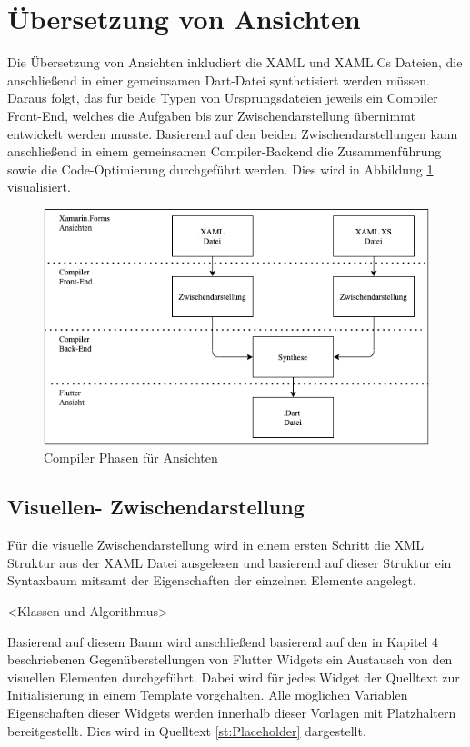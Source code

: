 \section{Übersetzung von Ansichten}
Die Übersetzung von Ansichten inkludiert die XAML und XAML.Cs Dateien, die anschließend in einer gemeinsamen Dart-Datei synthetisiert werden müssen.  Daraus folgt,  das für beide Typen von Ursprungsdateien jeweils ein Compiler Front-End,  welches die Aufgaben bis zur Zwischendarstellung übernimmt entwickelt werden musste.  Basierend auf den beiden Zwischendarstellungen kann anschließend in einem gemeinsamen Compiler-Backend die Zusammenführung sowie die Code-Optimierung durchgeführt werden.  Dies wird in Abbildung  \ref{fig:ViewCompilerPhases} visualisiert. 

\begin{figure}[!ht]
 \includegraphics[width=\textwidth,keepaspectratio]{Images/Implementation/ViewCompiler.png}
 \caption{Compiler Phasen für Ansichten}
 \label{fig:ViewCompilerPhases}
\end{figure}

\subsection{Visuellen- Zwischendarstellung}

Für die visuelle Zwischendarstellung wird in einem ersten Schritt die XML Struktur aus der XAML Datei ausgelesen und basierend auf dieser Struktur ein Syntaxbaum mitsamt der Eigenschaften der einzelnen Elemente angelegt.  

<Klassen und Algorithmus>


Basierend auf diesem Baum wird anschließend basierend auf den in Kapitel 4 beschriebenen Gegenüberstellungen von Flutter Widgets ein Austausch von den visuellen Elementen durchgeführt.  Dabei wird für jedes Widget der Quelltext zur Initialisierung in einem Template vorgehalten.  Alle möglichen Variablen Eigenschaften dieser Widgets werden innerhalb dieser Vorlagen mit Platzhaltern bereitgestellt.  Dies wird in Quelltext \ref{st:Placeholder} dargestellt.


